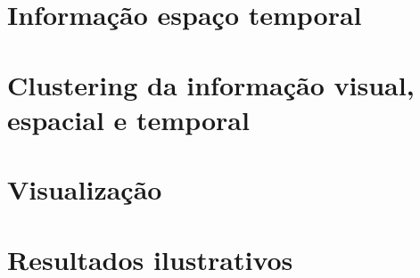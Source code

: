 \section{Informação espaço temporal}



\section{Clustering da informação visual, espacial e temporal}

\section{Visualização}

\section{Resultados ilustrativos}